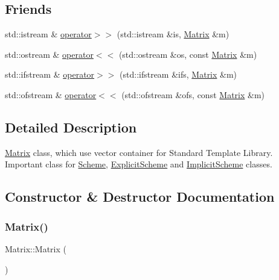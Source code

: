 \subsection*{Friends}
\begin{DoxyCompactItemize}
\item 
std\+::istream \& \mbox{\hyperlink{class_matrix_a3d6c1dcfc038804f4c08687f4f37f48b}{operator$>$$>$}} (std\+::istream \&is, \mbox{\hyperlink{class_matrix}{Matrix}} \&m)
\item 
std\+::ostream \& \mbox{\hyperlink{class_matrix_a060711074cb5bcaf4e75498bc040c4b7}{operator$<$$<$}} (std\+::ostream \&os, const \mbox{\hyperlink{class_matrix}{Matrix}} \&m)
\item 
std\+::ifstream \& \mbox{\hyperlink{class_matrix_aa5699a0bdf0ee014f083ff8a76629d21}{operator$>$$>$}} (std\+::ifstream \&ifs, \mbox{\hyperlink{class_matrix}{Matrix}} \&m)
\item 
std\+::ofstream \& \mbox{\hyperlink{class_matrix_aa574249d63b390cf1108d6e82047ef61}{operator$<$$<$}} (std\+::ofstream \&ofs, const \mbox{\hyperlink{class_matrix}{Matrix}} \&m)
\end{DoxyCompactItemize}


\subsection{Detailed Description}
\mbox{\hyperlink{class_matrix}{Matrix}} class, which use vector container for Standard Template Library. Important class for \mbox{\hyperlink{class_scheme}{Scheme}}, \mbox{\hyperlink{class_explicit_scheme}{Explicit\+Scheme}} and \mbox{\hyperlink{class_implicit_scheme}{Implicit\+Scheme}} classes. 

\subsection{Constructor \& Destructor Documentation}
\mbox{\label{class_matrix_a2dba13c45127354c9f75ef576f49269b}} 
\subsubsection{\texorpdfstring{Matrix()}{Matrix()}\hspace{0.1cm}{\footnotesize\ttfamily [1/3]}}
{\footnotesize\ttfamily Matrix\+::\+Matrix (\begin{DoxyParamCaption}{ }\end{DoxyParamCaption})}

